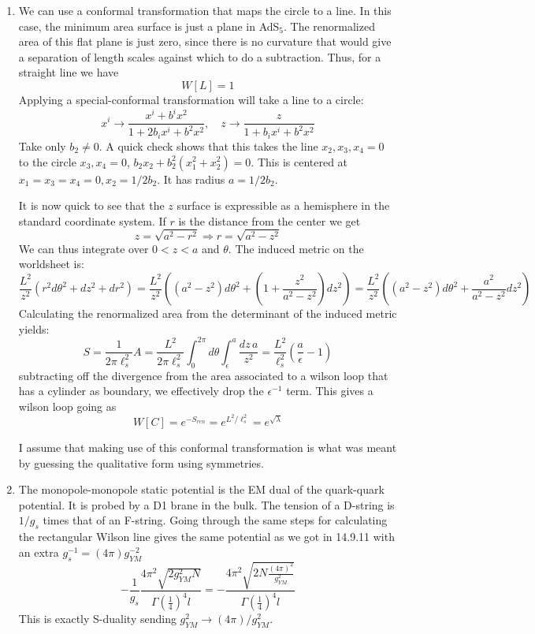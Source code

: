 \documentclass[11pt, class=article, crop=false]{standalone}
\begin{document}
\begin{enumerate}
	\item We can use a conformal transformation that maps the circle to a line. In this case, the minimum area surface is just a plane in AdS$_5$. The renormalized area of this flat plane is just zero, since there is no curvature that would give a separation of length scales against which to do a subtraction. Thus, for a straight line we have 
	\[
		W[L] = 1
	\]
	Applying a special-conformal transformation will take a line to a circle:
	\[
		x^i \to \frac{x^i + b^i x^2}{1 + 2 b_i x^i + b^2 x^2}, \quad z \to \frac{z}{1+ b_i x^i + b^2 x^2}
	\]
	Take only $b_2 \neq 0$. A quick check shows that this takes the line $x_2, x_3, x_4 = 0$ to the circle $x_3, x_4 = 0$, $b_2 x_2 + b_2^2 (x_1^2 + x_2^2) = 0$. This is centered at $x_1 = x_3 = x_4 =0, x_2 =1/2 b_2$. It has radius $a = 1/2b_2$.
	
	It is now quick to see that the $z$ surface is expressible as a hemisphere in the standard coordinate system. If $r$ is the distance from the center we get
	\[
		z = \sqrt{a^2 - r^2} \Rightarrow r = \sqrt{a^2 - z^2}
	\]
	We can thus integrate over $0 < z < a$ and $\theta$. The induced metric on the worldsheet is:
	\[
		\frac{L^2}{z^2} \left( r^2 d\theta^2 + dz^2 + dr^2 \right) = \frac{L^2}{z^2} \left( (a^2 - z^2) d\theta^2 + \left(1 + \frac{z^2}{a^2 - z^2} \right) dz^2 \right) = \frac{L^2}{z^2} \left( (a^2 - z^2) d\theta^2 + \frac{a^2}{a^2 - z^2} dz^2 \right)
	\]
	Calculating the renormalized area from the determinant of the induced metric yields:
	\[
		S = \frac{1}{2 \pi \ell_s^2} A = \frac{L^2}{2 \pi \ell_s^2} \int_0^{2\pi} d\theta \int_\epsilon^a  \frac{dz\, a}{z^2} = \frac{L^2}{\ell_s^2} \left(\frac{a}{\epsilon} - 1\right)
	\]
	subtracting off the divergence from the area associated to a wilson loop that has a cylinder as boundary, we effectively drop the $\epsilon^{-1}$ term. This gives a wilson loop going as
	\[
		W[C] = e^{-S_{ren}} = e^{L^2/\ell_s^2} = e^{\sqrt{\lambda}}
	\]
	
	I assume that making use of this conformal transformation is what was meant by guessing the qualitative form using symmetries. 
	
	\item The monopole-monopole static potential is the EM dual of the quark-quark potential. It is probed by a D1 brane in the bulk. The tension of a D-string is $1/g_s$ times that of an F-string. Going through the same steps for calculating the rectangular Wilson line gives the same potential as we got in 14.9.11 with an extra $g_s^{-1} = (4 \pi) g_{YM}^{-2}$
	\[
		- \frac{1}{g_s} \frac{4 \pi^2 \sqrt{2 g_{YM}^2 N}}{\Gamma(\frac14)^4 l} = - \frac{4 \pi^2 \sqrt{2 N \frac{(4 \pi)^2}{g_{YM}^2}}}{ \Gamma(\frac14)^4 l}
	\]
	This is exactly S-duality sending $g_{YM}^2 \to (4\pi)/g_{YM}^2$.
	

\end{enumerate}
\end{document}
